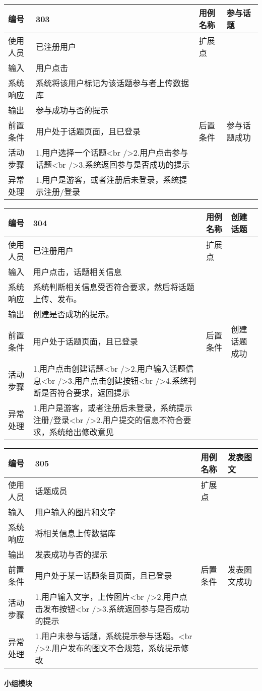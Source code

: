 \documentclass[
]{article}
\begin{document}
\begin{longtable}[]{@{}llll@{}}
\toprule
编号 & 303 & 用例名称 & 参与话题\tabularnewline
\midrule
\endhead
使用人员 & 已注册用户 & 扩展点 &\tabularnewline
输入 & 用户点击 & &\tabularnewline
系统响应 & 系统将该用户标记为该话题参与者上传数据库 & &\tabularnewline
输出 & 参与成功与否的提示 & &\tabularnewline
前置条件 & 用户处于话题页面，且已登录 & 后置条件 &
参与话题成功\tabularnewline
活动步骤 & 1.用户选择一个话题\textless br
/\textgreater{}2.用户点击参与话题\textless br
/\textgreater{}3.系统返回参与是否成功的提示 & &\tabularnewline
异常处理 & 1.用户是游客，或者注册后未登录，系统提示注册/登录 &
&\tabularnewline
\bottomrule
\end{longtable}

\begin{longtable}[]{@{}llll@{}}
\toprule
编号 & 304 & 用例名称 & 创建话题\tabularnewline
\midrule
\endhead
使用人员 & 已注册用户 & 扩展点 &\tabularnewline
输入 & 用户点击，话题相关信息 & &\tabularnewline
系统响应 & 系统判断相关信息受否符合要求，然后将话题上传、发布。 &
&\tabularnewline
输出 & 创建是否成功的提示。 & &\tabularnewline
前置条件 & 用户处于话题页面，且已登录 & 后置条件 &
创建话题成功\tabularnewline
活动步骤 & 1.用户点击创建话题\textless br
/\textgreater{}2.用户输入话题信息\textless br
/\textgreater{}3.用户点击创建按钮\textless br
/\textgreater{}4.系统判断是否符合要求，返回提示 & &\tabularnewline
异常处理 & 1.用户是游客，或者注册后未登录，系统提示注册/登录\textless br
/\textgreater{}2.用户提交的信息不符合要求，系统给出修改意见 &
&\tabularnewline
\bottomrule
\end{longtable}

\begin{longtable}[]{@{}llll@{}}
\toprule
编号 & 305 & 用例名称 & 发表图文\tabularnewline
\midrule
\endhead
使用人员 & 话题成员 & 扩展点 &\tabularnewline
输入 & 用户输入的图片和文字 & &\tabularnewline
系统响应 & 将相关信息上传数据库 & &\tabularnewline
输出 & 发表成功与否的提示 & &\tabularnewline
前置条件 & 用户处于某一话题条目页面，且已登录 & 后置条件 &
发表图文成功\tabularnewline
活动步骤 & 1.用户输入文字，上传图片\textless br
/\textgreater{}2.用户点击发布按钮\textless br
/\textgreater{}3.系统返回参与是否成功的提示 & &\tabularnewline
异常处理 & 1.用户未参与话题，系统提示参与话题。\textless br
/\textgreater{}2.用户发布的图文不合规范，系统提示修改 & &\tabularnewline
\bottomrule
\end{longtable}

\hypertarget{header-n860}{%
\paragraph{小组模块}\label{header-n860}}
\end{document}
